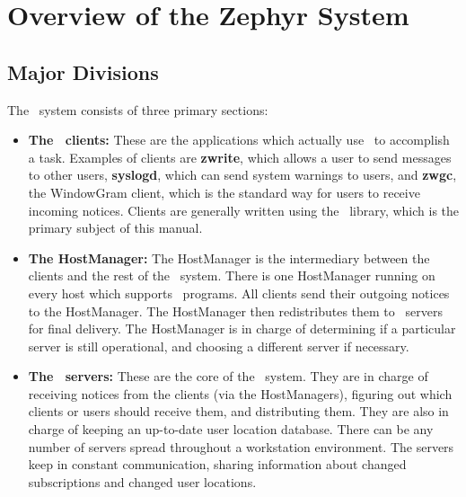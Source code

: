 %
\section{Overview of the Zephyr System}
\label{overview}

\subsection{Major Divisions}

The \Zephyr\ system consists of three primary sections:

\begin{itemize}
\item{\bf The \Zephyr\ clients:} These are the applications which
actually use \Zephyr\ to accomplish a task.  Examples of clients are
{\bf zwrite}, which allows a user to send messages to other users,
{\bf syslogd}, which can send system warnings to users, and {\bf zwgc},
the WindowGram client, which is the standard way for users to receive
incoming notices.  Clients are generally written using the \Zephyr\
library, which is the primary subject of this manual.

\item{\bf The HostManager:} The HostManager is the intermediary between the
clients and the rest of the \Zephyr\ system.  There is one HostManager
running on every host which supports \Zephyr\ programs.  All clients
send their outgoing notices to the HostManager.  The HostManager then
redistributes them to \Zephyr\ servers for final delivery.  The
HostManager is in charge of determining if a particular server is still
operational, and choosing a different server if necessary.

\item{\bf The \Zephyr\ servers:} These are the core of the \Zephyr\
system.  They are in charge of receiving notices from the clients (via
the HostManagers), figuring out which clients or users should receive
them, and distributing them.  They are also in charge of keeping an
up-to-date user location database.  There can be any number of servers
spread throughout a workstation environment.  The servers keep in
constant communication, sharing information about changed
subscriptions and changed user locations.
\end{itemize}

